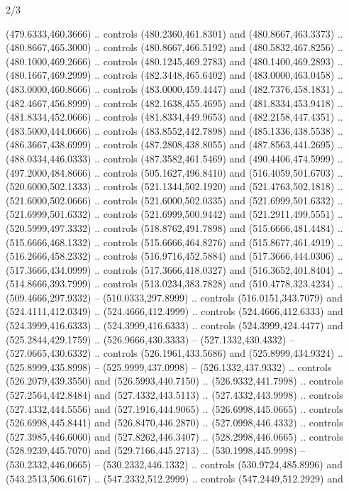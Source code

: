 \begin{flagdescription}{2/3}
\begin{scope}[xshift=0.5\flaglength,yshift=0.5\flagwidth,scale=\flagwidth/525.28]
\begin{scope}[y=0.1mm, x=0.1mm, yscale=-1,shift={(-381.5,-404)}]
\begin{scope}[shift={(5.25001,4.53053)},miter limit=4.00,line width=0.800\lw]
  (479.6333,460.3666) .. controls (480.2360,461.8301) and (480.8667,463.3373) ..
  (480.8667,465.3000) .. controls (480.8667,466.5192) and (480.5832,467.8256) ..
  (480.1000,469.2666) .. controls (480.1245,469.2783) and (480.1400,469.2893) ..
  (480.1667,469.2999) .. controls (482.3448,465.6402) and (483.0000,463.0458) ..
  (483.0000,460.8666) .. controls (483.0000,459.4447) and (482.7376,458.1831) ..
  (482.4667,456.8999) .. controls (482.1638,455.4695) and (481.8334,453.9418) ..
  (481.8334,452.0666) .. controls (481.8334,449.9653) and (482.2158,447.4351) ..
  (483.5000,444.0666) .. controls (483.8552,442.7898) and (485.1336,438.5538) ..
  (486.3667,438.6999) .. controls (487.2808,438.8055) and (487.8563,441.2695) ..
  (488.0334,446.0333) .. controls (487.3582,461.5469) and (490.4406,474.5999) ..
  (497.2000,484.8666) .. controls (505.1627,496.8410) and (516.4059,501.6703) ..
  (520.6000,502.1333) .. controls (521.1344,502.1920) and (521.4763,502.1818) ..
  (521.6000,502.0666) .. controls (521.6000,502.0335) and (521.6999,501.6332) ..
  (521.6999,501.6332) .. controls (521.6999,500.9442) and (521.2911,499.5551) ..
  (520.5999,497.3332) .. controls (518.8762,491.7898) and (515.6666,481.4484) ..
  (515.6666,468.1332) .. controls (515.6666,464.8276) and (515.8677,461.4919) ..
  (516.2666,458.2332) .. controls (516.9716,452.5884) and (517.3666,444.0306) ..
  (517.3666,434.0999) .. controls (517.3666,418.0327) and (516.3652,401.8404) ..
  (514.8666,393.7999) .. controls (513.0234,383.7828) and (510.4778,323.4234) ..
  (509.4666,297.9332) -- (510.0333,297.8999) .. controls (516.0151,343.7079) and
  (524.4111,412.0349) .. (524.4666,412.4999) .. controls (524.4666,412.6333) and
  (524.3999,416.6333) .. (524.3999,416.6333) .. controls (524.3999,424.4477) and
  (525.2844,429.1759) .. (526.9666,430.3333) -- (527.1332,430.4332) --
  (527.0665,430.6332) .. controls (526.1961,433.5686) and (525.8999,434.9324) ..
  (525.8999,435.8998) -- (525.9999,437.0998) -- (526.1332,437.9332) .. controls
  (526.2079,439.3550) and (526.5993,440.7150) .. (526.9332,441.7998) .. controls
  (527.2564,442.8484) and (527.4332,443.5113) .. (527.4332,443.9998) .. controls
  (527.4332,444.5556) and (527.1916,444.9065) .. (526.6998,445.0665) .. controls
  (526.6998,445.8441) and (526.8470,446.2870) .. (527.0998,446.4332) .. controls
  (527.3985,446.6060) and (527.8262,446.3407) .. (528.2998,446.0665) .. controls
  (528.9239,445.7070) and (529.7166,445.2713) .. (530.1998,445.9998) --
  (530.2332,446.0665) -- (530.2332,446.1332) .. controls (530.9724,485.8996) and
  (543.2513,506.6167) .. (547.2332,512.2999) .. controls (547.2449,512.2929) and

\end{scope}
\end{scope}
\end{scope}
\end{flagdescription}
